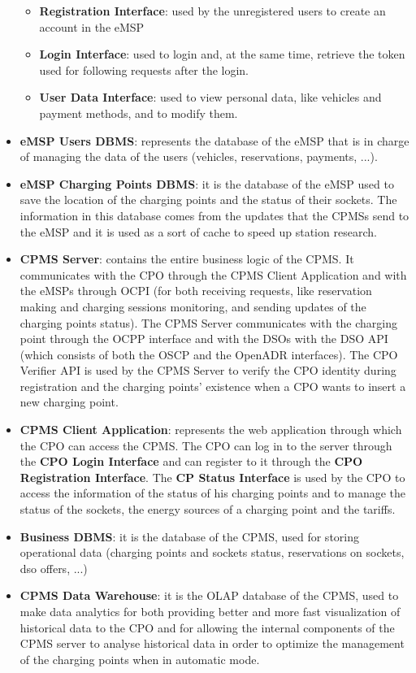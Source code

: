 \documentclass{Configuration_Files/PoliMi3i_thesis}
\begin{document}
\begin{itemize}
\begin{itemize}
            \item \textbf{Registration Interface}: used by the unregistered users to create an account in the eMSP
            \item \textbf{Login Interface}: used to login and, at the same time, retrieve the token used for following requests after the login.
            \item \textbf{User Data Interface}: used to view personal data, like vehicles and payment methods, and to modify them.
        \end{itemize}
    \item \textbf{eMSP Users DBMS}: represents the database of the eMSP that is in charge of managing the data of the users (vehicles, reservations, payments, ...).
    \item \textbf{eMSP Charging Points DBMS}: it is the database of the eMSP used to save the location of the charging points and the status of their sockets. The information in this database comes from the updates that the CPMSs send to the eMSP and it is used as a sort of cache to speed up station research.
    \item \textbf{CPMS Server}: contains the entire business logic of the CPMS. It communicates with the CPO through the CPMS Client Application and with the eMSPs through OCPI (for both receiving requests, like reservation making and charging sessions monitoring, and sending updates of the charging points status). The CPMS Server communicates with the charging point through the OCPP interface and with the DSOs with the DSO API (which consists of both the OSCP and the OpenADR interfaces). The CPO Verifier API is used by the CPMS Server to verify the CPO identity during registration and the charging points' existence when a CPO wants to insert a new charging point.
    \item \textbf{CPMS Client Application}: represents the web application through which the CPO can access the CPMS. The CPO can log in to the server through the \textbf{CPO Login Interface} and can register to it through the \textbf{CPO Registration Interface}. The \textbf{CP Status Interface} is used by the CPO to access the information of the status of his charging points and to manage the status of the sockets, the energy sources of a charging point and the tariffs.
    \item \textbf{Business DBMS}: it is the database of the CPMS, used for storing operational data (charging points and sockets status, reservations on sockets, dso offers, ...)
    \item \textbf{CPMS Data Warehouse}: it is the OLAP database of the CPMS, used to make data analytics for both providing better and more fast visualization of historical data to the CPO and for allowing the internal components of the CPMS server to analyse historical data in order to optimize the management of the charging points when in automatic mode.
\end{itemize}
\end{document}
